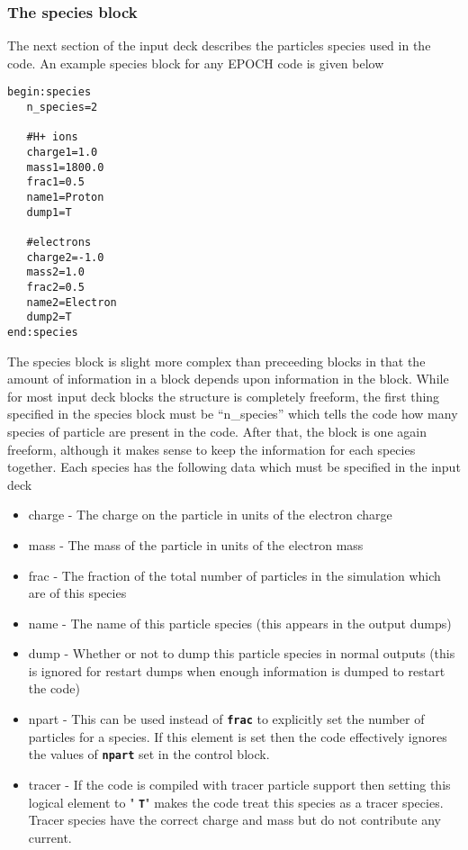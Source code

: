 \documentclass[12pt]{article}
\newcommand{\simpleboxverbatim}{\begin{Verbatim}[obeytabs=true,frame=single,
  framerule=0.5mm,rulecolor=\color{warwickmid}]}
\newcommand{\inlinecode}[1]{{\color{warwickred} \bf\texttt{#1}}}
\newcommand{\EPOCH}{{\color{warwickdark}\fontfamily{phv}\selectfont EPOCH} }
\begin{document}
\subsubsection{The species block}
The next section of the input deck describes the particles species used in the
code. An example species block for any \EPOCH code is given below\\
\simpleboxverbatim
begin:species
   n_species=2

   #H+ ions
   charge1=1.0
   mass1=1800.0
   frac1=0.5
   name1=Proton
   dump1=T

   #electrons
   charge2=-1.0
   mass2=1.0
   frac2=0.5
   name2=Electron
   dump2=T
end:species
\end{Verbatim}

The species block is slight more complex than preceeding blocks in that the
amount of information in a block depends upon information in the block. While
for most input deck blocks the structure is completely freeform, the first
thing specified in the species block must be ``n\_species'' which tells the
code how many species of particle are present in the code. After that, the
block is one again freeform, although it makes sense to keep the information
for each species together. Each species has the following data which must be
specified in the input deck\\
\begin{itemize}
\item charge - The charge on the particle in units of the electron charge
\item mass - The mass of the particle in units of the electron mass
\item frac - The fraction of the total number of particles in the simulation
  which are of this species
\item name - The name of this particle species (this appears in the output
  dumps)
\item dump - Whether or not to dump this particle species in normal outputs
  (this is ignored for restart dumps when enough information is dumped to
  restart the code)
\item npart - This can be used instead of \inlinecode{frac} to explicitly set
  the number of particles for a species. If this element is set then the code
  effectively ignores the values of \inlinecode{npart} set in the control
  block.
\item tracer - If the code is compiled with tracer particle support then
  setting this logical element to "\inlinecode{T}" makes the code treat this
  species as a tracer species. Tracer species have the correct charge and mass
  but do not contribute any current.
\end{itemize}
\end{document}
